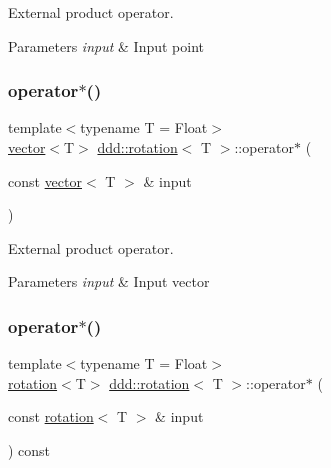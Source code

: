 External product operator. 


\begin{DoxyParams}{Parameters}
{\em input} & Input point \\
\hline
\end{DoxyParams}
\mbox{\label{classddd_1_1rotation_a1b55d8f810793caa469b12a2ca41ee6c}} 
\subsubsection{\texorpdfstring{operator$\ast$()}{operator*()}\hspace{0.1cm}{\footnotesize\ttfamily [3/4]}}
{\footnotesize\ttfamily template$<$typename T  = Float$>$ \\
\hyperlink{classddd_1_1vector}{vector}$<$T$>$ \hyperlink{classddd_1_1rotation}{ddd\+::rotation}$<$ T $>$\+::operator$\ast$ (\begin{DoxyParamCaption}\item[{const \hyperlink{classddd_1_1vector}{vector}$<$ T $>$ \&}]{input }\end{DoxyParamCaption})\hspace{0.3cm}{\ttfamily [inline]}}



External product operator. 


\begin{DoxyParams}{Parameters}
{\em input} & Input vector \\
\hline
\end{DoxyParams}
\mbox{\label{classddd_1_1rotation_a974dff537d71eef1dd26420b9b4e087d}} 
\subsubsection{\texorpdfstring{operator$\ast$()}{operator*()}\hspace{0.1cm}{\footnotesize\ttfamily [4/4]}}
{\footnotesize\ttfamily template$<$typename T  = Float$>$ \\
\hyperlink{classddd_1_1rotation}{rotation}$<$T$>$ \hyperlink{classddd_1_1rotation}{ddd\+::rotation}$<$ T $>$\+::operator$\ast$ (\begin{DoxyParamCaption}\item[{const \hyperlink{classddd_1_1rotation}{rotation}$<$ T $>$ \&}]{input }\end{DoxyParamCaption}) const\hspace{0.3cm}{\ttfamily [inline]}}



